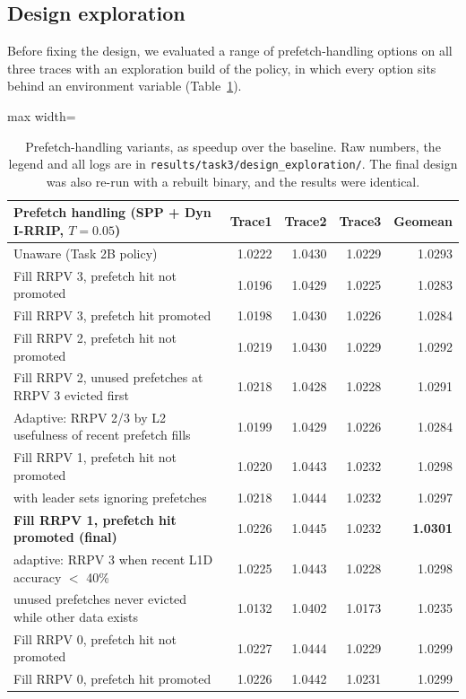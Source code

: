 \documentclass[11pt]{article}
\begin{document}
\subsection{Design exploration}
\label{sec:explore}

Before fixing the design, we evaluated a range of prefetch-handling options on all three traces
with an exploration build of the policy, in which every option sits behind an environment
variable (Table~\ref{tab:explore}).

\begin{table}[H]
\centering
\small
\begin{adjustbox}{max width=\textwidth}
\begin{tabular}{lrrrr}
\toprule
Prefetch handling (SPP + Dyn I-RRIP, $T=0.05$) & Trace1 & Trace2 & Trace3 & Geomean \\
\midrule
Unaware (Task 2B policy) & 1.0222 & 1.0430 & 1.0229 & 1.0293 \\
Fill RRPV 3, prefetch hit not promoted & 1.0196 & 1.0429 & 1.0225 & 1.0283 \\
Fill RRPV 3, prefetch hit promoted & 1.0198 & 1.0430 & 1.0226 & 1.0284 \\
Fill RRPV 2, prefetch hit not promoted & 1.0219 & 1.0430 & 1.0229 & 1.0292 \\
Fill RRPV 2, unused prefetches at RRPV 3 evicted first & 1.0218 & 1.0428 & 1.0228 & 1.0291 \\
Adaptive: RRPV 2/3 by L2 usefulness of recent prefetch fills & 1.0199 & 1.0429 & 1.0226 & 1.0284 \\
Fill RRPV 1, prefetch hit not promoted & 1.0220 & 1.0443 & 1.0232 & 1.0298 \\
\quad with leader sets ignoring prefetches & 1.0218 & 1.0444 & 1.0232 & 1.0297 \\
\textbf{Fill RRPV 1, prefetch hit promoted (final)} & 1.0226 & 1.0445 & 1.0232 & \textbf{1.0301} \\
\quad adaptive: RRPV 3 when recent L1D accuracy $<$ 40\% & 1.0225 & 1.0443 & 1.0228 & 1.0298 \\
\quad unused prefetches never evicted while other data exists & 1.0132 & 1.0402 & 1.0173 & 1.0235 \\
Fill RRPV 0, prefetch hit not promoted & 1.0227 & 1.0444 & 1.0229 & 1.0299 \\
Fill RRPV 0, prefetch hit promoted & 1.0226 & 1.0442 & 1.0231 & 1.0299 \\
\bottomrule
\end{tabular}
\end{adjustbox}
\caption{Prefetch-handling variants, as speedup over the baseline. Raw numbers, the legend and
all logs are in \texttt{results/task3/design\_exploration/}. The final design was also re-run
with a rebuilt binary, and the results were identical.}
\label{tab:explore}
\end{table}
\end{document}
